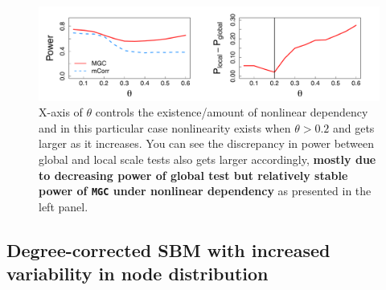 \documentclass[12pt]{article}
\begin{document}
\begin{figure}[h]
	\centering
	\includegraphics[width=\linewidth]{../Figure/powerplot_simple.pdf}
	\caption{X-axis of $\theta$ controls the existence/amount of nonlinear dependency and in this particular case nonlinearity exists when $\theta > 0.2$ and gets larger as it increases. You can see the discrepancy in power between global and local scale tests also gets larger accordingly, \textbf{mostly due to decreasing power of global test but relatively stable power of \texttt{MGC} under nonlinear dependency} as presented in the left panel.}
	\label{fig:powerplot}
\end{figure}


\subsection*{Degree-corrected SBM with increased variability in node distribution}	
\end{document}
